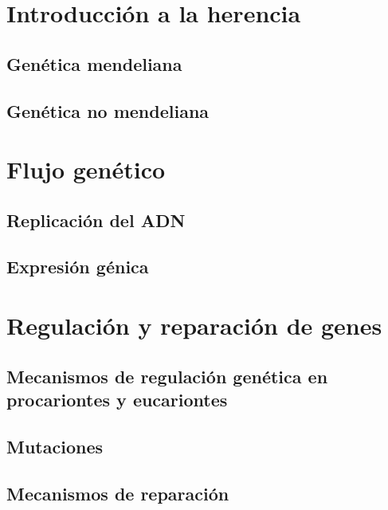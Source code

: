 \documentclass{../summarie}
\begin{document}
\frontmatter

    \Portada
    \tableofcontents
    \listoffigures
    \listoftables

\mainmatter
    
    \onehalfspacing


\part{Introducción a la herencia}

    \chapter{Genética mendeliana} 
    \chapter{Genética no mendeliana} 

\part{Flujo genético}

    \chapter{Replicación del ADN} 
    \chapter{Expresión génica} 

\part{Regulación y reparación de genes}

    \chapter{Mecanismos de regulación genética en procariontes y eucariontes} 
    \chapter{Mutaciones} 
    \chapter{Mecanismos de reparación} 
\end{document}
